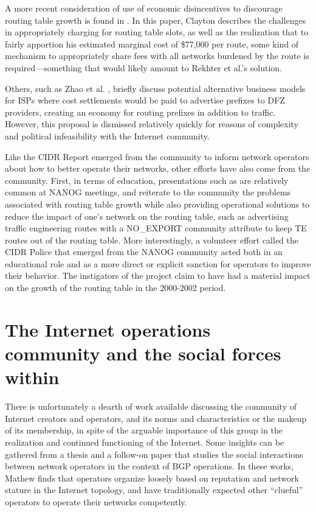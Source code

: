 A more recent consideration of use of economic disincentives to discourage
routing table growth is found in \cite{Clayton:2010bh}. In this paper, Clayton
describes the challenges in appropriately charging for routing table slots, as
well as the realization that to fairly apportion his estimated marginal cost of
\$77,000 per route, some kind of mechanism to appropriately share fees with all
networks burdened by the route is required---something that would likely amount
to Rekhter et al.'s solution.

Others, such as Zhao et al. \cite{Zhao:2001ly}, briefly discuss potential
alternative business models for ISPs where cost settlements would be paid to
advertise prefixes to DFZ providers, creating an economy for routing prefixes
in addition to traffic. However, this proposal is dismissed relatively quickly
for reasons of complexity and political infeasibility with the Internet
community.

Like the CIDR Report emerged from the community to inform network operators
about how to better operate their networks, other efforts have also come from
the community. First, in terms of education, presentations such as
\cite{Steenbergen:2010nx} are relatively common at NANOG meetings, and
reiterate to the community the problems associated with routing table growth
while also providing operational solutions to reduce the impact of one's
network on the routing table, such as advertising traffic engineering
routes with a NO\_EXPORT community attribute to keep TE routes out of the
routing table.  More interestingly, a volunteer effort called the CIDR
Police \cite{Nussbacher:2003ys} that emerged from the NANOG community acted
both in an educational role and as a more direct or explicit sanction for
operators to improve their behavior. The instigators of the project claim
to have had a material impact on the growth of the routing table in the
2000-2002 period.

\section{The Internet operations community and the social forces within}

There is unfortunately a dearth of work available discussing the community of
Internet creators and operators, and its norms and characteristics or the
makeup of its membership, in spite of the arguable importance of this group in
the realization and continued functioning of the Internet. Some insights can be
gathered from a thesis \cite{Mathew:2009dz} and a follow-on paper
\cite{Mathew:2010ly} that studies the social interactions between network
operators in the context of BGP operations. In these works, Mathew finds that
operators organize loosely based on reputation and network stature in the
Internet topology, and have traditionally expected other ``clueful'' operators
to operate their networks competently.


